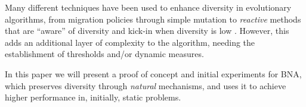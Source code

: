 Many different techniques have been used to enhance diversity in evolutionary
algorithms, from migration policies \cite{10.1007/978-3-642-29178-4_6} through
simple mutation \cite{jackson2011mutation} to {\em
  reactive} methods that are ``aware'' of diversity and kick-in when diversity
is low \cite{zaharie2006diversity}. However, this adds an additional layer of
complexity to the algorithm, needing the establishment of thresholds and/or
dynamic measures.

In this paper we will present a proof of concept and initial experiments for
{\sf BNA}, which preserves diversity through {\em natural} mechanisms, and uses
it to achieve higher performance in, initially, static problems.